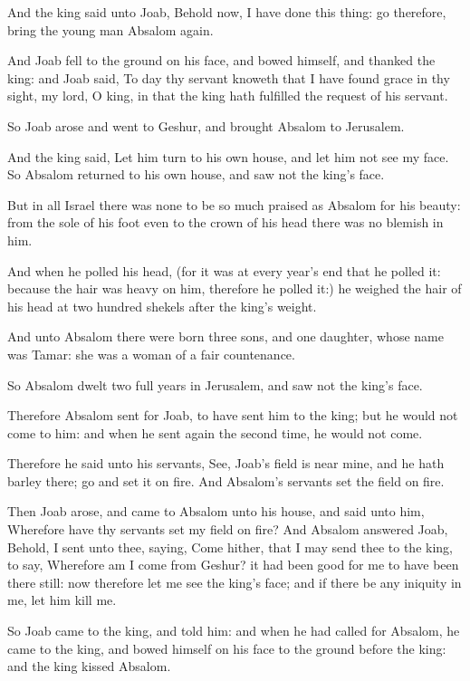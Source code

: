 \verse And the king said unto Joab, Behold now, I have done this thing: go therefore, bring the young man Absalom again.

\verse And Joab fell to the ground on his face, and bowed himself, and thanked the king: and Joab said, To day thy servant knoweth that I have found grace in thy sight, my lord, O king, in that the king hath fulfilled the request of his servant.

\verse So Joab arose and went to Geshur, and brought Absalom to Jerusalem.

\verse And the king said, Let him turn to his own house, and let him not see my face. So Absalom returned to his own house, and saw not the king's face.

\verse But in all Israel there was none to be so much praised as Absalom for his beauty: from the sole of his foot even to the crown of his head there was no blemish in him.

\verse And when he polled his head, (for it was at every year's end that he polled it: because the hair was heavy on him, therefore he polled it:) he weighed the hair of his head at two hundred shekels after the king's weight.

\verse And unto Absalom there were born three sons, and one daughter, whose name was Tamar: she was a woman of a fair countenance.

\verse So Absalom dwelt two full years in Jerusalem, and saw not the king's face.

\verse Therefore Absalom sent for Joab, to have sent him to the king; but he would not come to him: and when he sent again the second time, he would not come.

\verse Therefore he said unto his servants, See, Joab's field is near mine, and he hath barley there; go and set it on fire. And Absalom's servants set the field on fire.

\verse Then Joab arose, and came to Absalom unto his house, and said unto him, Wherefore have thy servants set my field on fire?  \verse And Absalom answered Joab, Behold, I sent unto thee, saying, Come hither, that I may send thee to the king, to say, Wherefore am I come from Geshur? it had been good for me to have been there still: now therefore let me see the king's face; and if there be any iniquity in me, let him kill me.

\verse So Joab came to the king, and told him: and when he had called for Absalom, he came to the king, and bowed himself on his face to the ground before the king: and the king kissed Absalom.


